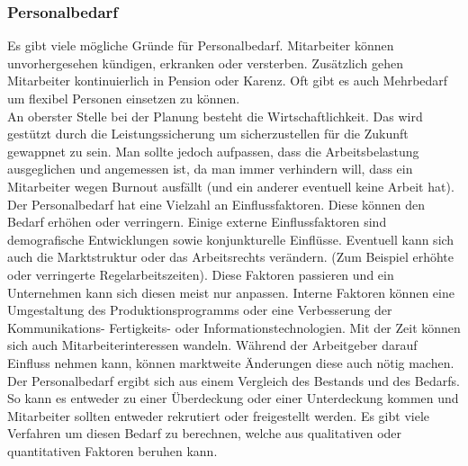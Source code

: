 \documentclass{article}
\begin{document}
	 \subsubsection{Personalbedarf}
	 Es gibt viele mögliche Gründe für Personalbedarf. Mitarbeiter können unvorhergesehen kündigen, erkranken oder versterben. Zusätzlich gehen Mitarbeiter kontinuierlich in Pension oder Karenz. Oft gibt es auch Mehrbedarf um flexibel Personen einsetzen zu können. \\
	 An oberster Stelle bei der Planung besteht die Wirtschaftlichkeit. Das wird gestützt durch die Leistungssicherung um sicherzustellen für die Zukunft gewappnet zu sein. Man sollte jedoch aufpassen, dass die Arbeitsbelastung ausgeglichen und angemessen ist, da man immer verhindern will, dass ein Mitarbeiter wegen Burnout ausfällt (und ein anderer eventuell keine Arbeit hat). \\
	 Der Personalbedarf hat eine Vielzahl an Einflussfaktoren. Diese können den Bedarf erhöhen oder verringern. Einige externe Einflussfaktoren sind demografische Entwicklungen sowie konjunkturelle Einflüsse. Eventuell kann sich auch die Marktstruktur oder das Arbeitsrechts verändern. (Zum Beispiel erhöhte oder verringerte Regelarbeitszeiten). Diese Faktoren passieren und ein Unternehmen kann sich diesen meist nur anpassen. Interne Faktoren können eine Umgestaltung des Produktionsprogramms oder eine Verbesserung der Kommunikations- Fertigkeits- oder Informationstechnologien. Mit der Zeit können sich auch Mitarbeiterinteressen wandeln. Während der Arbeitgeber darauf Einfluss nehmen kann, können marktweite Änderungen diese auch nötig machen. \\
	 Der Personalbedarf ergibt sich aus einem Vergleich des Bestands und des Bedarfs. So kann es entweder zu einer Überdeckung oder einer Unterdeckung kommen und Mitarbeiter sollten entweder rekrutiert oder freigestellt werden. Es gibt viele Verfahren um diesen Bedarf zu berechnen, welche aus qualitativen oder quantitativen Faktoren beruhen kann. \\
\end{document}
